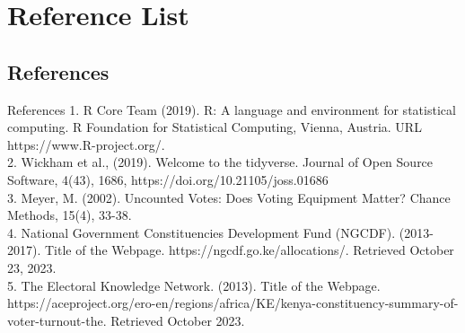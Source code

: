 \documentclass{beamer}
\begin{document}
\section{Reference List}
\subsection{References}

\begin{frame}{References}
  \leftskip 0.1in
  \parindent -0.1in
  1. R Core Team (2019). R: A language and environment for statistical computing. R Foundation for Statistical Computing, Vienna, Austria. URL https://www.R-project.org/.\\
 2. Wickham et al., (2019). Welcome to the tidyverse. Journal of Open Source Software, 4(43), 1686, https://doi.org/10.21105/joss.01686 \\
3. Meyer, M. (2002). Uncounted Votes: Does Voting Equipment Matter? Chance Methods, 15(4), 33-38.\\
 4. National Government Constituencies Development Fund (NGCDF). (2013-2017). Title of the Webpage. https://ngcdf.go.ke/allocations/. Retrieved October 23, 2023.\\
 5. The Electoral Knowledge Network. (2013). Title of the Webpage. https://aceproject.org/ero-en/regions/africa/KE/kenya-constituency-summary-of-voter-turnout-the. Retrieved October 2023.
\end{frame}
\end{document}
